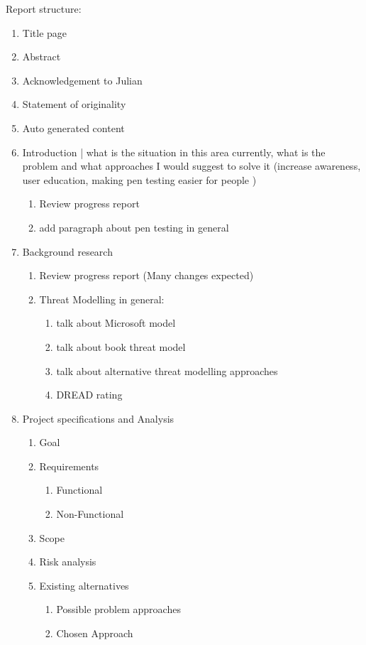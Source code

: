 Report structure:
\begin{enumerate}
	\item Title page
	
	\item Abstract
	
	\item Acknowledgement to Julian
	
	\item Statement of originality
	
	\item Auto generated content
	
	\item Introduction | what is the situation in this area currently, what is the problem and what approaches I would suggest to solve it (increase awareness, user education, making pen testing easier for people )
	\begin{enumerate}
	  	\item Review progress report
	  	\item add paragraph about pen testing in general
	\end{enumerate}
	
	\item Background research
	\begin{enumerate}
		\item Review progress report (Many changes expected)
		\item Threat Modelling in general:
		\begin{enumerate}
			\item talk about Microsoft model
			\item talk about book threat model
			\item talk about alternative threat modelling approaches
			\item DREAD rating
		\end{enumerate}
	\end{enumerate}
	
	\item Project specifications and Analysis
	\begin{enumerate}
		\item Goal
		\item Requirements
		\begin{enumerate}
			\item Functional
			\item Non-Functional
		\end{enumerate}
		\item Scope
		\item Risk analysis
		\item Existing alternatives
		\begin{enumerate}
			\item Possible problem approaches
			\item Chosen Approach
		\end{enumerate}
	\end{enumerate}


\end{enumerate}
